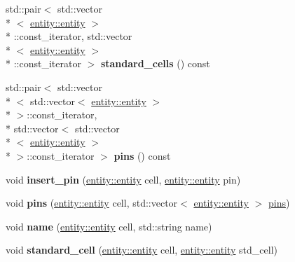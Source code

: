 \begin{DoxyCompactItemize}
\item 
\hypertarget{classophidian_1_1netlist_1_1cells_a59fc84704009c8f61269b7dd018a0885}{std\-::pair$<$ std\-::vector\\*
$<$ \hyperlink{classophidian_1_1entity_1_1entity}{entity\-::entity} $>$\\*
\-::const\-\_\-iterator, std\-::vector\\*
$<$ \hyperlink{classophidian_1_1entity_1_1entity}{entity\-::entity} $>$\\*
\-::const\-\_\-iterator $>$ {\bfseries standard\-\_\-cells} () const }\label{classophidian_1_1netlist_1_1cells_a59fc84704009c8f61269b7dd018a0885}

\item 
\hypertarget{classophidian_1_1netlist_1_1cells_aad4efeed03acf0135986a3de5df9d154}{std\-::pair$<$ std\-::vector\\*
$<$ std\-::vector$<$ \hyperlink{classophidian_1_1entity_1_1entity}{entity\-::entity} $>$\\*
 $>$\-::const\-\_\-iterator, \\*
std\-::vector$<$ std\-::vector\\*
$<$ \hyperlink{classophidian_1_1entity_1_1entity}{entity\-::entity} $>$\\*
 $>$\-::const\-\_\-iterator $>$ {\bfseries pins} () const }\label{classophidian_1_1netlist_1_1cells_aad4efeed03acf0135986a3de5df9d154}

\item 
\hypertarget{classophidian_1_1netlist_1_1cells_a8a612f11975a72af426b0a8aa9a7b563}{void {\bfseries insert\-\_\-pin} (\hyperlink{classophidian_1_1entity_1_1entity}{entity\-::entity} cell, \hyperlink{classophidian_1_1entity_1_1entity}{entity\-::entity} pin)}\label{classophidian_1_1netlist_1_1cells_a8a612f11975a72af426b0a8aa9a7b563}

\item 
\hypertarget{classophidian_1_1netlist_1_1cells_a7533958d018d866839513df46b7697be}{void {\bfseries pins} (\hyperlink{classophidian_1_1entity_1_1entity}{entity\-::entity} cell, std\-::vector$<$ \hyperlink{classophidian_1_1entity_1_1entity}{entity\-::entity} $>$ \hyperlink{classophidian_1_1netlist_1_1pins}{pins})}\label{classophidian_1_1netlist_1_1cells_a7533958d018d866839513df46b7697be}

\item 
\hypertarget{classophidian_1_1netlist_1_1cells_a5121c211e44f66d2dadda35e8db78218}{void {\bfseries name} (\hyperlink{classophidian_1_1entity_1_1entity}{entity\-::entity} cell, std\-::string name)}\label{classophidian_1_1netlist_1_1cells_a5121c211e44f66d2dadda35e8db78218}

\item 
\hypertarget{classophidian_1_1netlist_1_1cells_a6b9d4f1bfdcb0b199520b474962d313b}{void {\bfseries standard\-\_\-cell} (\hyperlink{classophidian_1_1entity_1_1entity}{entity\-::entity} cell, \hyperlink{classophidian_1_1entity_1_1entity}{entity\-::entity} std\-\_\-cell)}\label{classophidian_1_1netlist_1_1cells_a6b9d4f1bfdcb0b199520b474962d313b}

\end{DoxyCompactItemize}


